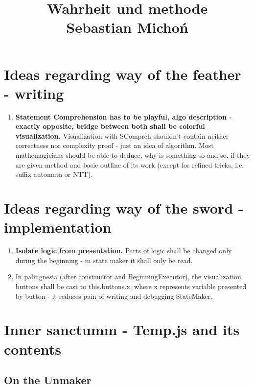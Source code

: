 \documentclass[12pt]{article}
\begin{document}
\title{Wahrheit und methode\\
\large Sebastian Michoń}
\date{\vspace{-10ex}}
\maketitle

\section {Ideas regarding way of the feather - writing}
\begin{enumerate}
	\item \textbf{Statement Comprehension has to be playful, algo description - exactly opposite, bridge between both shall be colorful visualization.} Visualization with SCompreh shouldn't contain neither correctness nor complexity proof - just an idea of algorithm. Most mathemagicians should be able to deduce, why is something so-and-so, if they are given method and basic outline of its work (except for refined tricks, i.e. suffix automata or NTT).
\end{enumerate}

\section {Ideas regarding way of the sword - implementation}
\begin{enumerate}
	\item \textbf{Isolate logic from presentation.} Parts of logic shall be changed only during the beginning - in state maker it shall only be read.
	\item In palingnesia (after constructor and BeginningExecutor), the visualization buttons shall be cast to this.buttons.x, where x represents variable presented by button - it reduces pain of writing and debugging StateMaker.
\end{enumerate}
\section {Inner sanctumm - Temp.js and its contents}


\subsection {On the Unmaker}
\end{document}
